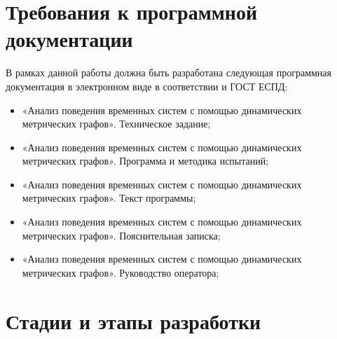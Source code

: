 \documentclass{../TechDoc}
\begin{document}
	\section{Требования к программной документации}
	В рамках данной работы должна быть разработана следующая программная документация в электронном виде в соответствии и ГОСТ ЕСПД:
	\begin{itemize}
		\item «Анализ поведения временных систем с помощью динамических метрических графов». Техническое задание\cite{TZbook};
		\item «Анализ поведения временных систем с помощью динамических метрических графов». Программа и методика испытаний\cite{TESTbook};
		\item «Анализ поведения временных систем с помощью динамических метрических графов». Текст программы\cite{SourceCodeBook};
		\item «Анализ поведения временных систем с помощью динамических метрических графов». Пояснительная записка\cite{PZbook};
		\item «Анализ поведения временных систем с помощью динамических метрических графов». Руководство оператора\cite{Operatorbook};
	\end{itemize}

	\section{Стадии и этапы разработки}       
\end{document}
